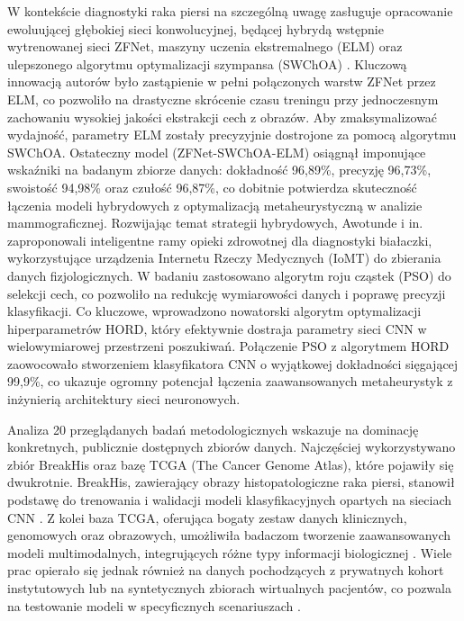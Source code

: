  
W kontekście diagnostyki raka piersi na szczególną uwagę zasługuje opracowanie ewoluującej głębokiej sieci konwolucyjnej, będącej hybrydą wstępnie wytrenowanej sieci ZFNet, maszyny uczenia ekstremalnego (ELM) oraz ulepszonego algorytmu optymalizacji szympansa (SWChOA) \cite{MM1}. Kluczową innowacją autorów było zastąpienie w pełni połączonych warstw ZFNet przez ELM, co pozwoliło na drastyczne skrócenie czasu treningu przy jednoczesnym zachowaniu wysokiej jakości ekstrakcji cech z obrazów. Aby zmaksymalizować wydajność, parametry ELM zostały precyzyjnie dostrojone za pomocą algorytmu SWChOA. Ostateczny model (ZFNet-SWChOA-ELM) osiągnął imponujące wskaźniki na badanym zbiorze danych: dokładność 96,89\%, precyzję 96,73\%, swoistość 94,98\% oraz czułość 96,87\%, co dobitnie potwierdza skuteczność łączenia modeli hybrydowych z optymalizacją metaheurystyczną w analizie mammograficznej.
Rozwijając temat strategii hybrydowych, Awotunde i in. \cite{II1} zaproponowali inteligentne ramy opieki zdrowotnej dla diagnostyki białaczki, wykorzystujące urządzenia Internetu Rzeczy Medycznych (IoMT) do zbierania danych fizjologicznych. W badaniu zastosowano algorytm roju cząstek (PSO) do selekcji cech, co pozwoliło na redukcję wymiarowości danych i poprawę precyzji klasyfikacji. Co kluczowe, wprowadzono nowatorski algorytm optymalizacji hiperparametrów HORD, który efektywnie dostraja parametry sieci CNN w wielowymiarowej przestrzeni poszukiwań. Połączenie PSO z algorytmem HORD zaowocowało stworzeniem klasyfikatora CNN o wyjątkowej dokładności sięgającej 99,9\%, co ukazuje ogromny potencjał łączenia zaawansowanych metaheurystyk z inżynierią architektury sieci neuronowych.


Analiza 20 przeglądanych badań metodologicznych wskazuje na dominację konkretnych, publicznie dostępnych zbiorów danych. Najczęściej wykorzystywano zbiór BreakHis oraz bazę TCGA (The Cancer Genome Atlas), które pojawiły się dwukrotnie. BreakHis, zawierający obrazy histopatologiczne raka piersi, stanowił podstawę do trenowania i walidacji modeli klasyfikacyjnych opartych na sieciach CNN \cite{GG1, JJ2}. Z kolei baza TCGA, oferująca bogaty zestaw danych klinicznych, genomowych oraz obrazowych, umożliwiła badaczom tworzenie zaawansowanych modeli multimodalnych, integrujących różne typy informacji biologicznej \cite{LL1, CC2}. Wiele prac opierało się jednak również na danych pochodzących z prywatnych kohort instytutowych lub na syntetycznych zbiorach wirtualnych pacjentów, co pozwala na testowanie modeli w specyficznych scenariuszach \cite{BB1, II2, CC2}.

